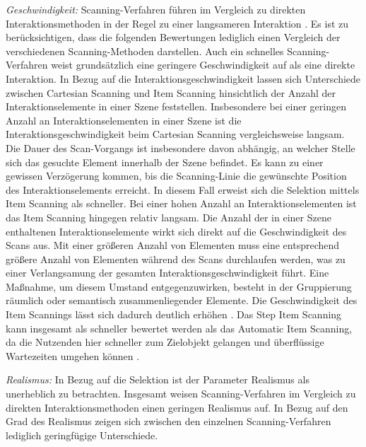 \textit{Geschwindigkeit:}
Scanning-Verfahren führen im Vergleich zu direkten Interaktionsmethoden in der Regel zu einer langsameren Interaktion \citep{cook_chapter_2015}. Es ist zu berücksichtigen, dass die folgenden Bewertungen lediglich einen Vergleich der verschiedenen Scanning-Methoden darstellen. Auch ein schnelles Scanning-Verfahren weist grundsätzlich eine geringere Geschwindigkeit auf als eine direkte Interaktion.
In Bezug auf die Interaktionsgeschwindigkeit lassen sich Unterschiede zwischen Cartesian Scanning und Item Scanning hinsichtlich der Anzahl der Interaktionselemente in einer Szene feststellen. Insbesondere bei einer geringen Anzahl an Interaktionselementen in einer Szene ist die Interaktionsgeschwindigkeit beim Cartesian Scanning vergleichsweise langsam. Die Dauer des Scan-Vorgangs ist insbesondere davon abhängig, an welcher Stelle sich das gesuchte Element innerhalb der Szene befindet. Es kann zu einer gewissen Verzögerung kommen, bis die Scanning-Linie die gewünschte Position des Interaktionselements erreicht. In diesem Fall erweist sich die Selektion mittels Item Scanning als schneller. Bei einer hohen Anzahl an Interaktionselementen ist das Item Scanning hingegen relativ langsam.  Die Anzahl der in einer Szene enthaltenen Interaktionselemente wirkt sich direkt auf die Geschwindigkeit des Scans aus. Mit einer größeren Anzahl von Elementen muss eine entsprechend größere Anzahl von Elementen während des Scans durchlaufen werden, was zu einer Verlangsamung der gesamten Interaktionsgeschwindigkeit führt. Eine Maßnahme, um diesem Umstand entgegenzuwirken, besteht in der Gruppierung räumlich oder semantisch zusammenliegender Elemente. Die Geschwindigkeit des Item Scannings lässt sich dadurch deutlich erhöhen \citep{cook_chapter_2015}. Das Step Item Scanning kann insgesamt als schneller bewertet werden als das Automatic Item Scanning, da die Nutzenden hier schneller zum Zielobjekt gelangen und überflüssige Wartezeiten umgehen können \citep{cook_chapter_2015}.  

\textit{Realismus:} In Bezug auf die Selektion ist der Parameter Realismus als unerheblich zu betrachten. Insgesamt weisen Scanning-Verfahren im Vergleich zu direkten Interaktionsmethoden einen geringen Realismus auf. In Bezug auf den Grad des Realismus zeigen sich zwischen den einzelnen Scanning-Verfahren lediglich geringfügige Unterschiede. 

